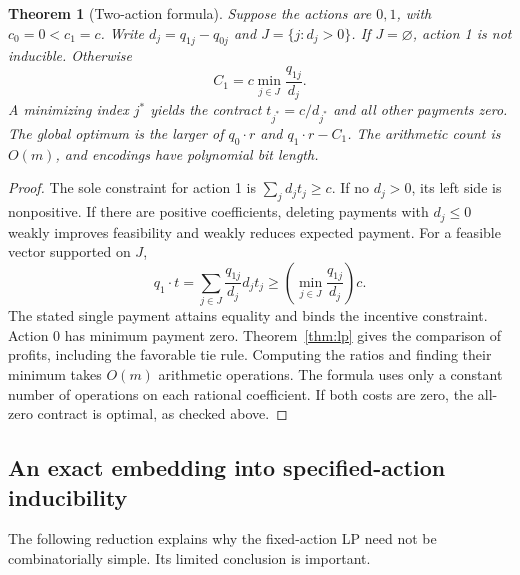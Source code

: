 \documentclass[11pt,a4paper]{article}
\newtheorem{theorem}{Theorem}[section]
\theoremstyle{definition}\newtheorem{definition}[theorem]{Definition}
\theoremstyle{remark}\newtheorem{remark}[theorem]{Remark}
\newcommand{\1}{\mathbf 1}
\begin{document}
\begin{theorem}[Two-action formula]\label{thm:two}
Suppose the actions are $0,1$, with $c_0=0<c_1=c$. Write $d_j=q_{1j}-q_{0j}$ and $J=\{j:d_j>0\}$. If $J=\varnothing$, action 1 is not inducible. Otherwise
\[
 C_1=c\min_{j\in J}\frac{q_{1j}}{d_j}.
\]
A minimizing index $j^*$ yields the contract $t_{j^*}=c/d_{j^*}$ and all other payments zero. The global optimum is the larger of $q_0\cdot r$ and $q_1\cdot r-C_1$. The arithmetic count is $O(m)$, and encodings have polynomial bit length.
\end{theorem}
\begin{proof}
The sole constraint for action 1 is $\sum_jd_jt_j\ge c$. If no $d_j>0$, its left side is nonpositive. If there are positive coefficients, deleting payments with $d_j\le0$ weakly improves feasibility and weakly reduces expected payment. For a feasible vector supported on $J$,
\[
 q_1\cdot t
 =\sum_{j\in J}\frac{q_{1j}}{d_j}d_jt_j
 \ge\left(\min_{j\in J}\frac{q_{1j}}{d_j}\right)c.
\]
The stated single payment attains equality and binds the incentive constraint. Action 0 has minimum payment zero. Theorem~\ref{thm:lp} gives the comparison of profits, including the favorable tie rule. Computing the ratios and finding their minimum takes $O(m)$ arithmetic operations. The formula uses only a constant number of operations on each rational coefficient. If both costs are zero, the all-zero contract is optimal, as checked above.
\end{proof}

\subsection{An exact embedding into specified-action inducibility}
The following reduction explains why the fixed-action LP need not be combinatorially simple. Its limited conclusion is important.
\end{document}
